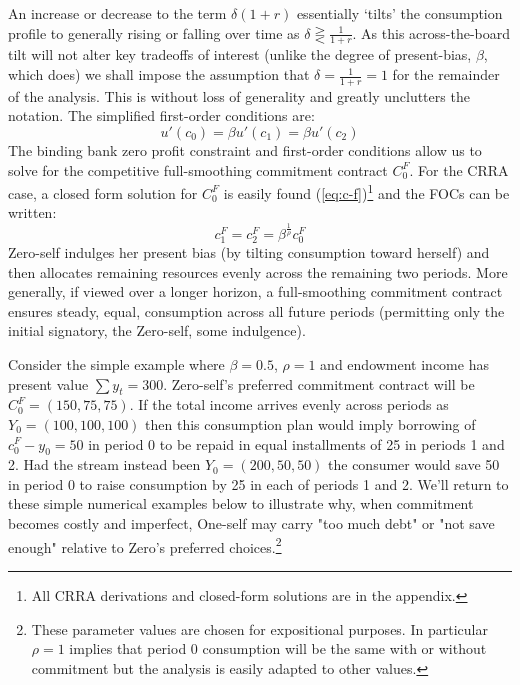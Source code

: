 \documentclass[11pt,english]{article}
\theoremstyle{plain}
\theoremstyle{definition}
\begin{document}
An increase or decrease to the term $\delta(1+r)$ essentially `tilts'
the consumption profile to generally rising or falling over time as
$\delta\gtreqless\frac{1}{1+r}$. As this across-the-board tilt will
not alter key tradeoffs of interest (unlike the degree of present-bias,
$\beta$, which does) we shall impose the assumption that
$\delta=\frac{1}{1+r}=1$ for the remainder of the analysis. This
is without loss of generality and greatly unclutters the notation. The
simplified first-order conditions are: 
\begin{equation}
u'\left(c_{0}\right)=\beta u'\left(c_{1}\right)=\beta u'\left(c_{2}\right)\label{eq:FOC_comp}
\end{equation}
The binding bank zero profit constraint and first-order conditions
allow us to solve for the competitive full-smoothing commitment
contract $C_{0}^{F}$. For the CRRA case, a closed form solution for $C_{0}^{F}$ is
easily found (\ref{eq:c-f})\footnote{All CRRA derivations and closed-form solutions are in the appendix.}
and the FOCs can be written: 
\begin{equation}
c_{1}^{F}=c_{2}^{F}=\beta^{\frac{1}{\rho}}c_{0}^{F}
\end{equation}
Zero-self indulges her present bias (by tilting consumption toward
herself) and then allocates remaining resources  evenly
across the remaining two periods. More generally, if viewed over a longer horizon, a full-smoothing commitment contract ensures steady, equal, consumption across all future periods (permitting only the initial signatory, the Zero-self, some indulgence).


Consider the simple example where $\beta=0.5$, $\rho=1$ and endowment
income has present value $\sum y_{t}=300$. Zero-self's preferred
commitment contract will be $C_{0}^{F}=(150,75,75)$. If the total
income arrives evenly across periods as $Y_{0}=(100,100,100)$ then
this consumption plan would imply borrowing of $c_{0}^{F}-y_{0}=50$
in period 0 to be repaid in equal installments of 25 in periods 1
and 2. Had the stream instead been $Y_{0}=(200,50,50)$ the consumer
would save 50 in period 0 to raise consumption by 25 in each of periods
1 and 2. We'll return to these simple numerical examples below to illustrate
why, when commitment becomes costly and imperfect, One-self may carry
"too much debt" or "not save enough" relative to Zero's preferred
choices.\footnote{These parameter values are chosen for expositional purposes. In particular
$\rho=1$ implies that period 0 consumption will be the same with
or without commitment but the analysis is easily adapted to other
values.}
\end{document}
